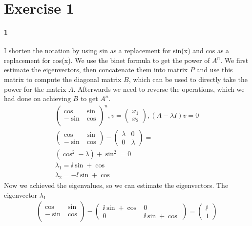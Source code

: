 \section{Exercise 1}

\paragraph*{1}
I shorten the notation by using sin as a replacement for sin(x) and cos as a replacement for cos(x).
We use the binet formula to get the power of $A^n$.
We first estimate the eigenvectors, then concatenate them into matrix $P$ and use this matrix to compute the diagonal matrix $B$, which can be used to directly take the power for the matrix $A$. Afterwards we need to reverse the operations, which we had done on achieving $B$ to get $A^n$.
\begin{eqnarray*}
\left( \begin{array}{cc}
\cos & \sin \\
-\sin & \cos \\
\end{array} \right)^n , v = \left( \begin{array}{c} x_1\\x_2 \end{array} \right), ( A-\lambda I )v = 0
\\
\left( \begin{array}{cc}
\cos & \sin \\
- \sin & \cos 
\end{array}
\right) -
\left( \begin{array}{cc}
\lambda & 0 \\
0 & \lambda
\end{array} 
\right)
= \\
(\cos ^2 - \lambda) + \sin ^2 = 0 \\
\lambda _1 = \ii \sin + \cos \\
\lambda _2 = - \ii \sin + \cos
\end{eqnarray*}
Now we achieved the eigenvalues, so we can estimate the eigenvectors.
The eigenvector $\lambda _1$
\begin{eqnarray*}
\left( \begin{array}{cc}
\cos & \sin \\
- \sin & \cos \\
\end{array} 
\right)
-
\left( \begin{array}{cc}
\ii \sin + \cos & 0\\
0 & \ii \sin + \cos 
\end{array} 
\right)
=
\left( \begin{array}{c}
\ii \\
1 
\end{array}
\right)
\end{eqnarray*}
